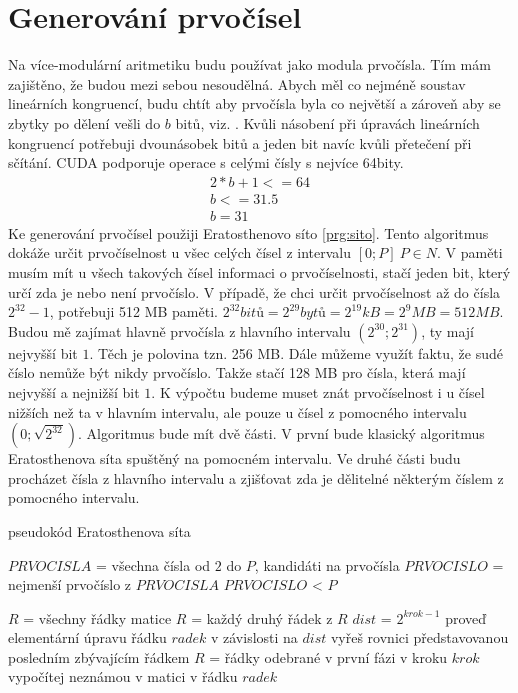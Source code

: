 \documentclass[thesis=M,czech]{FITthesis}[2012/06/26]
\newcommand{\pozn}[1]{ {\color{red}{#1}} }
\begin{document}
\section{Generování prvočísel}
Na více-modulární aritmetiku budu používat jako modula prvočísla. Tím mám zajištěno, že budou mezi sebou nesoudělná. Abych měl co nejméně soustav lineárních kongruencí, budu chtít aby prvočísla byla co největší a zároveň aby se zbytky po dělení vešli do $b$ bitů, viz. . Kvůli násobení při úpravách lineárních kongruencí potřebuji dvounásobek bitů a jeden bit navíc kvůli přetečení při sčítání. CUDA podporuje operace s celými čísly s nejvíce 64bity.
\begin{eqnarray}
2 * b + 1 <= 64 \nonumber \\
b <= 31.5 \nonumber  \\
b = 31 \nonumber
\end{eqnarray}
Ke generování prvočísel použiji Eratosthenovo síto \ref{prg:sito}. Tento algoritmus dokáže určit prvočíselnost u všec celých čísel z intervalu $[0;P] ~ P \in N$. V paměti musím mít u všech takových čísel informaci o prvočíselnosti, stačí jeden bit, který určí zda je nebo není prvočíslo. V případě, že chci určit prvočíselnost až do čísla $2^32-1$, potřebuji 512 MB paměti.
$2^32 bitů = 2^29 bytů = 2^19 kB = 2^9 MB = 512 MB$.
Budou mě zajímat hlavně prvočísla z hlavního intervalu $(2^30;2^31)$, ty mají nejvyšší bit $1$. Těch je polovina tzn. 256 MB. Dále můžeme využít faktu, že sudé číslo nemůže být nikdy prvočíslo. Takže stačí 128 MB pro čísla, která mají nejvyšší a nejnižší bit $1$. K výpočtu budeme muset znát prvočíselnost i u čísel nižších než ta v hlavním intervalu, ale pouze u čísel z pomocného intervalu $(0;\sqrt{2^32})$.
\pozn{TODO: proč stačí $\sqrt{2^32}$}
Algoritmus bude mít dvě části. V první bude klasický algoritmus Eratosthenova síta spuštěný na pomocném intervalu. Ve druhé části budu procházet čísla z hlavního intervalu a zjišťovat zda je dělitelné některým číslem z pomocného intervalu.


\begin{algorithm}[H]
\caption{pseudokód Eratosthenova síta}
\label{prg:sito}
\begin{algorithmic}[1]
\STATE $PRVOCISLA$ = všechna čísla od $2$ do $P$, kandidáti na prvočísla
\DO 
\FOR $PRVOCISLO$ = nejmenší prvočíslo z $PRVOCISLA$
\WHILE $PRVOCISLO$ < $P$
	

\STATE $R$ = všechny řádky matice
\label{prg:pseudoCR_vnejsi}
	\STATE $R$ = každý druhý řádek z $R$
	 \label{prg:pseudoCR_vnitrni}
		\STATE $dist$ = $2^{krok-1}$
		\STATE proveď elementární úpravu řádku $radek$ v závislosti na $dist$
	\ENDFOR
\ENDFOR
\STATE vyřeš rovnici představovanou posledním zbývajícím řádkem
\label{prg:pseudoCR_vnejsi2}
	\STATE $R$ = řádky odebrané v první fázi v kroku $krok$
	\label{prg:pseudoCR_vnitrni2}
		\STATE vypočítej neznámou v matici v řádku $radek$
	\ENDFOR
\ENDFOR
\end{algorithmic}
\end{algorithm}
\end{document}
